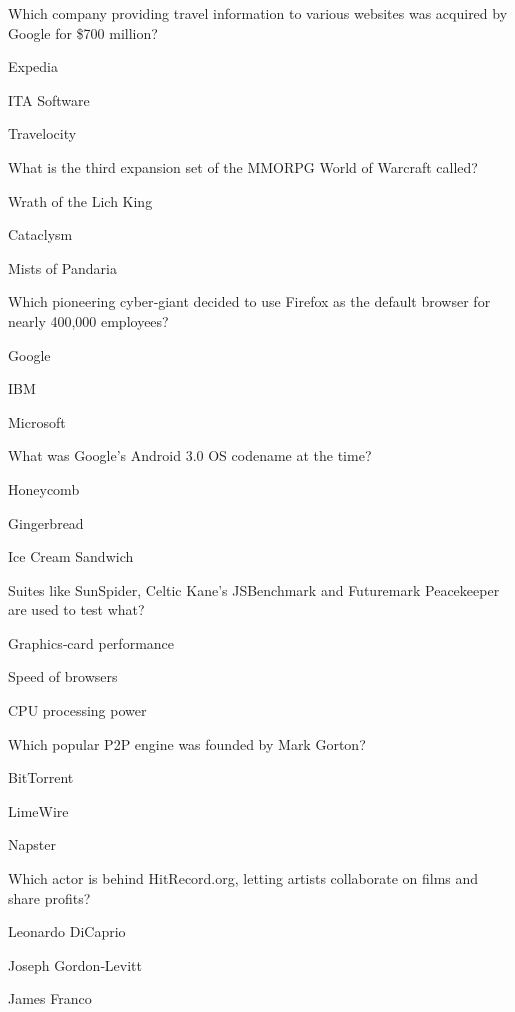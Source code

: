 \begin{enhancedmcq}{Which company providing travel information to various websites was acquired by Google for \$700 million?}
\item Expedia
\item ITA Software
\item Travelocity

\end{enhancedmcq}
\begin{enhancedmcq}{What is the third expansion set of the MMORPG World of Warcraft called?}
\item Wrath of the Lich King
\item Cataclysm
\item Mists of Pandaria

\end{enhancedmcq}
\begin{enhancedmcq}{Which pioneering cyber‑giant decided to use Firefox as the default browser for nearly 400,000 employees?}
\item Google
\item IBM
\item Microsoft

\end{enhancedmcq}
\begin{enhancedmcq}{What was Google's Android 3.0 OS codename at the time?}
\item Honeycomb
\item Gingerbread
\item Ice Cream Sandwich

\end{enhancedmcq}
\begin{enhancedmcq}{Suites like SunSpider, Celtic Kane's JSBenchmark and Futuremark Peacekeeper are used to test what?}
\item Graphics‑card performance
\item Speed of browsers
\item CPU processing power

\end{enhancedmcq}
\begin{enhancedmcq}{Which popular P2P engine was founded by Mark Gorton?}
\item BitTorrent
\item LimeWire
\item Napster

\end{enhancedmcq}
\begin{enhancedmcq}{Which actor is behind HitRecord.org, letting artists collaborate on films and share profits?}
\item Leonardo DiCaprio
\item Joseph Gordon‑Levitt
\item James Franco

\end{enhancedmcq}
